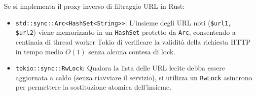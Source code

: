 \documentclass[11pt,a4paper]{article}
\begin{document}
\begin{altbox}
Se si implementa il proxy inverso di filtraggio URL in Rust:
\begin{itemize}
    \item \texttt{std::sync::Arc<HashSet<String>>}: L'insieme degli URL noti (\texttt{\$url1, \$url2}) viene memorizzato in un \texttt{HashSet} protetto da \texttt{Arc}, consentendo a centinaia di thread worker Tokio di verificare la validit\`a della richiesta HTTP in tempo medio $O(1)$ senza alcuna contesa di lock.
    \item \texttt{tokio::sync::RwLock}: Qualora la lista delle URL lecite debba essere aggiornata a caldo (senza riavviare il servizio), si utilizza un \texttt{RwLock} asincrono per permettere la sostituzione atomica dell'insieme.
\end{itemize}
\end{altbox}
\end{document}

